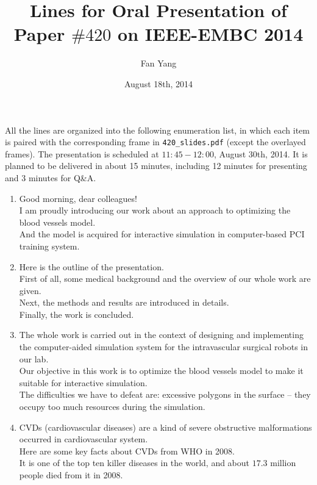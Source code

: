 \documentclass{article}
\begin{document}
\title{\bf \Large Lines for Oral Presentation of Paper $\#420$ on IEEE-EMBC 2014}
\author{Fan Yang}
\date{August 18th, 2014}
\maketitle

All the lines are organized into the following enumeration list, in which each item is paired with the corresponding frame in \texttt{420\_slides.pdf} (except the overlayed frames). %
The presentation is scheduled at $11:45 - 12:00$, August 30th, 2014. 
It is planned to be delivered in about 15 minutes, including 12 minutes for presenting and 3 minutes for Q\&A. 

\begin{enumerate}

\item Good morning, dear colleagues! \\
      I am proudly introducing our work about an approach to optimizing the blood vessels model. \\
	  And the model is acquired for interactive simulation in computer-based PCI training system. 
      
\item Here is the outline of the presentation. \\
      First of all, some medical background and the overview of our whole work are given. \\
      Next, the methods and results are introduced in details. \\
      Finally, the work is concluded.

\item The whole work is carried out in the context of designing and implementing the computer-aided simulation system for the intravascular surgical robots in our lab. \\
      Our objective in this work is to optimize the blood vessels model to make it suitable for interactive simulation. \\
      The difficulties we have to defeat are: excessive polygons in the surface -- they occupy too much resources during the simulation.
      
\item CVDs (cardiovascular diseases) are a kind of severe obstructive malformations occurred in cardiovascular system.\\
      Here are some key facts about CVDs from WHO in 2008.\\
      It is one of the top ten killer diseases in the world, and about $17.3$ million people died from it in 2008.


\end{enumerate}
\end{document}
